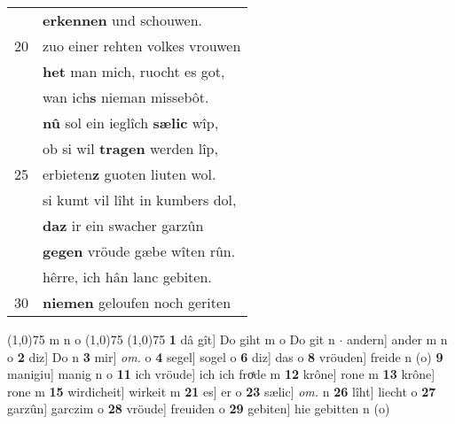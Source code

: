 \documentclass[8pt,a4paper,notitlepage]{article}
\begin{document}
\begin{table}[ht]
\begin{minipage}[t]{0.5\linewidth}
\begin{tabular}{rl}
 & \textbf{erkennen} und schouwen.\\ 
20 & zuo einer rehten volkes vrouwen\\ 
 & \textbf{het} man mich, ruocht es got,\\ 
 & wan ich\textbf{s} nieman missebôt.\\ 
 & \textbf{nû} sol ein ieglîch \textbf{sælic} wîp,\\ 
 & ob si wil \textbf{tragen} werden lîp,\\ 
25 & erbieten\textbf{z} guoten liuten wol.\\ 
 & si kumt vil lîht in kumbers dol,\\ 
 & \textbf{daz} ir ein swacher garzûn\\ 
 & \textbf{gegen} vröude gæbe wîten rûn.\\ 
 & hêrre, ich hân lanc gebiten.\\ 
30 & \textbf{niemen} geloufen noch geriten\\ 
\end{tabular}
\scriptsize
\line(1,0){75} \newline
m n o \newline
\line(1,0){75} \newline
\newline
\line(1,0){75} \newline
\textbf{1} dâ gît] Do giht m o Do git n  $\cdot$ andern] ander m n o \textbf{2} diz] Do n \textbf{3} mir] \textit{om.} o \textbf{4} segel] sogel o \textbf{6} diz] das o \textbf{8} vröuden] freide n (o) \textbf{9} manigiu] manig n o \textbf{11} ich vröude] ich ich froͯde m \textbf{12} krône] rone m \textbf{13} krône] rone m \textbf{15} wirdicheit] wirkeit m \textbf{21} es] er o \textbf{23} sælic] \textit{om.} n \textbf{26} lîht] liecht o \textbf{27} garzûn] garczim o \textbf{28} vröude] freuiden o \textbf{29} gebiten] hie gebitten n (o) \newline
\end{minipage}
\end{table}
\newpage
\end{document}
